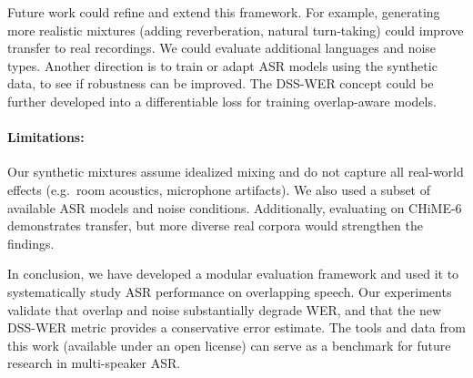 \documentclass[11pt,a4paper]{report}
\begin{document}
Future work could refine and extend this framework. For example, generating more realistic mixtures (adding reverberation, natural turn-taking) could improve transfer to real recordings. We could evaluate additional languages and noise types. Another direction is to train or adapt ASR models using the synthetic data, to see if robustness can be improved. The DSS-WER concept could be further developed into a differentiable loss for training overlap-aware models.

\paragraph{Limitations:} Our synthetic mixtures assume idealized mixing and do not capture all real-world effects (e.g.\ room acoustics, microphone artifacts). We also used a subset of available ASR models and noise conditions. Additionally, evaluating on CHiME-6 demonstrates transfer, but more diverse real corpora would strengthen the findings.

In conclusion, we have developed a modular evaluation framework and used it to systematically study ASR performance on overlapping speech. Our experiments validate that overlap and noise substantially degrade WER, and that the new DSS-WER metric provides a conservative error estimate. The tools and data from this work (available under an open license) can serve as a benchmark for future research in multi-speaker ASR.



\end{document}
